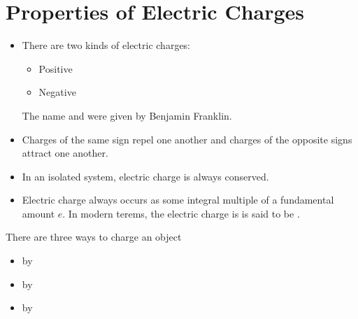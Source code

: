 \chapter{Properties of Electric Charges}

    \begin{itemize}
        \item There are two kinds of electric charges:
            \begin{itemize}
                \item Positive
                \item Negative
            \end{itemize}
            The name  and  were given by Benjamin Franklin.
        \item Charges of the same sign repel one another and charges of the opposite signs attract
            one another.
        \item In an isolated system, electric charge is always conserved.
        \item Electric charge always occurs as some integral multiple of a fundamental amount $e$.
            In modern terems, the electric charge is is said to be .
    \end{itemize}

    \par{There are three ways to charge an object}
    \begin{itemize}
        \item by 
        \item by 
        \item by 
    \end{itemize}

